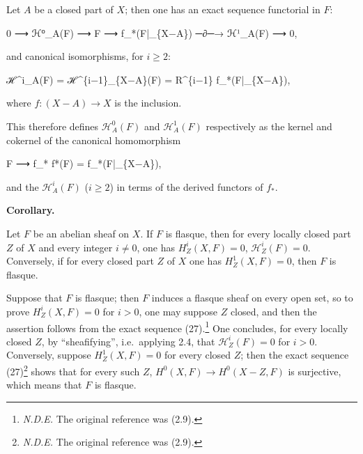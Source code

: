 \documentclass[
]{article}
\newenvironment{Shaded}{}{}
\newcommand{\NormalTok}[1]{#1}
\begin{document}
Let \(A\) be a closed part of \(X\); then one has an exact sequence
functorial in \(F\):

\begin{Shaded}
\begin{Highlighting}[]
\NormalTok{0 ⟶ ℋ⁰\_A(F) ⟶ F ⟶ f\_*(F|\_\{X−A\}) ─∂─→ ℋ¹\_A(F) ⟶ 0,}
\end{Highlighting}
\end{Shaded}

and canonical isomorphisms, for \(i \geqslant 2\):

\begin{Shaded}
\begin{Highlighting}[]
\NormalTok{ℋ\^{}i\_A(F) = ℋ\^{}\{i−1\}\_\{X−A\}(F) = R\^{}\{i−1\} f\_*(F|\_\{X−A\}),}
\end{Highlighting}
\end{Shaded}

where \(f: (X - A) \to X\) is the inclusion.

This therefore defines \(\mathcal{H}^{0}_{A}(F)\) and
\(\mathcal{H}^{1}_{A}(F)\) respectively as the kernel and cokernel of
the canonical homomorphism

\begin{Shaded}
\begin{Highlighting}[]
\NormalTok{F ⟶ f\_* f*(F) = f\_*(F|\_\{X−A\}),}
\end{Highlighting}
\end{Shaded}

and the \(\mathcal{H}^{i}_{A}(F)\) (\(i \geqslant 2\)) in terms of the
derived functors of \(f_{*}\).

\textbf{Corollary.}

Let \(F\) be an abelian sheaf on \(X\). If \(F\) is flasque, then for
every locally closed part \(Z\) of \(X\) and every integer \(i \neq 0\),
one has \(H^{i}_{Z}(X, F) = 0\), \(\mathcal{H}^{i}_{Z}(F) = 0\).
Conversely, if for every closed part \(Z\) of \(X\) one has
\(H^{1}_{Z}(X, F) = 0\), then \(F\) is flasque.

Suppose that \(F\) is flasque; then \(F\) induces a flasque sheaf on
every open set, so to prove \(H^{i}_{Z}(X, F) = 0\) for \(i > 0\), one
may suppose \(Z\) closed, and then the assertion follows from the exact
sequence (27).\footnote{\emph{N.D.E.} The original reference was (2.9).}
One concludes, for every locally closed \(Z\), by ``sheafifying'',
i.e.~applying 2.4, that \(\mathcal{H}^{i}_{Z}(F) = 0\) for \(i > 0\).
Conversely, suppose \(H^{1}_{Z}(X, F) = 0\) for every closed \(Z\); then
the exact sequence (27)\footnote{\emph{N.D.E.} The original reference
  was (2.9).} shows that for every such \(Z\),
\(H^{0}(X, F) \to H^{0}(X - Z, F)\) is surjective, which means that
\(F\) is flasque.
\end{document}
